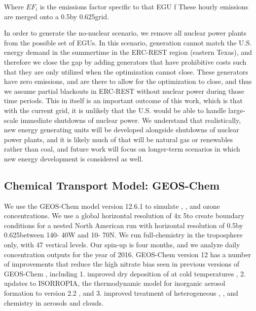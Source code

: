\documentclass[12]{article}
\begin{document}
Where $EF_i$ is the emissions factor specific to that EGU f
These hourly emissions are merged onto a 0.5\degree by 0.625\degree grid. 

In order to generate the no-nuclear scenario, we remove all nuclear power plants from the possible set of EGUs. In this scenario, generation cannot match the U.S. energy demand in the summertime in the ERC-REST region (eastern Texas), and therefore we close the gap by adding generators that have prohibitive costs such that they are only utilized when the optimization cannot close. These generators have zero emissions, and are there to allow for the optimization to close, and thus we assume partial blackouts in ERC-REST  without nuclear power during those time periods. This in itself is an important outcome of this work, which is that with the current grid, it is unlikely that the U.S. would be able to handle large-scale immediate shutdowns of nuclear power. We understand that realistically, new energy generating units will be developed alongside shutdowns of nuclear power plants, and it is likely much of that will be natural gas or renewables rather than coal, and future work will focus on longer-term scenarios in which new energy development is considered as well.

\subsection{Chemical Transport Model: GEOS-Chem}
We use the GEOS-Chem model \citep{} version 12.6.1 \citep{noauthor_geos-chem_2019} to simulate , ,  and ozone concentrations. We use a global horizontal resolution of 4\degree x 5\degree to create boundary conditions for a nested North American run with horizontal resolution of 0.5\degree by 0.625\degree between 140\degree - 40\degree W and 10\degree - 70\degree N. We run full-chemistry in the troposphere only, with 47 vertical levels. Our spin-up is four months, and we analyze daily concentration outputs for the year of 2016. GEOS-Chem version 12 has a number of improvements that reduce the high nitrate bias seen in previous versions of GEOS-Chem \citep{walker_simulation_2012}, including 1. improved dry deposition of  at cold temperatures \citep{jaegle_nitrogen_2018}, 2. updates to ISORROPIA, the thermodynamic model for inorganic aerosol formation to version 2.2 \citep{fountoukis_isorropia_2007}, and 3. improved treatment of heterogeneous , , and  chemistry in aerosols and clouds.
\end{document}
